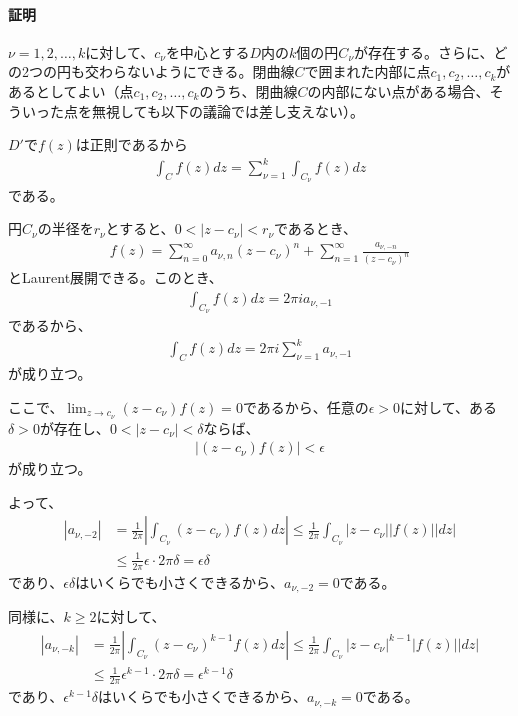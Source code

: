 \paragraph{証明}
$\nu=1,2,\dots,k$に対して、$c_\nu$を中心とする$D$内の$k$個の円$C_\nu$が存在する。さらに、どの2つの円も交わらないようにできる。閉曲線$C$で囲まれた内部に点$c_1,c_2,\dots,c_k$があるとしてよい（点$c_1,c_2,\dots,c_k$のうち、閉曲線$C$の内部にない点がある場合、そういった点を無視しても以下の議論では差し支えない）。

$D'$で$f(z)$は正則であるから
\begin{align*}
    \int_Cf(z)dz
    =\sum_{\nu=1}^{k}\int_{C_\nu}f(z)dz
\end{align*}
である。

円$C_\nu$の半径を$r_\nu$とすると、$0<|z-c_\nu|<r_\nu$であるとき、
\begin{align*}
    f(z)
    =\sum_{n=0}^{\infty}a_{\nu,n}(z-c_\nu)^n
    +\sum_{n=1}^{\infty}\frac{a_{\nu,-n}}{(z-c_\nu)^n}
\end{align*}
とLaurent展開できる。このとき、
\begin{align*}
    \int_{C_\nu}f(z)dz=2\pi i a_{\nu,-1}
\end{align*}
であるから、
\begin{align*}
    \int_Cf(z)dz
    =2\pi i \sum_{\nu=1}^{k}a_{\nu,-1}
\end{align*}
が成り立つ。

ここで、$\lim_{z\longrightarrow c_\nu}(z-c_\nu)f(z)=0$であるから、任意の$\epsilon>0$に対して、ある$\delta>0$が存在し、$0<|z-c_\nu|<\delta$ならば、
\begin{align*}
    |(z-c_\nu)f(z)|<\epsilon
\end{align*}
が成り立つ。

よって、
\begin{align*}
    |a_{\nu,-2}|
    &=\frac{1}{2\pi}\left| \int_{C_\nu}(z-c_\nu)f(z)dz\right|
    \le \frac{1}{2\pi}\int_{C_\nu}|z-c_\nu|\left|f(z)\right||dz|\\
    &\le \frac{1}{2\pi}\epsilon\cdot2\pi \delta=\epsilon \delta
\end{align*}
であり、$\epsilon \delta$はいくらでも小さくできるから、$a_{\nu,-2}=0$である。

同様に、$k\ge2$に対して、
\begin{align*}
    |a_{\nu,-k}|
    &=\frac{1}{2\pi}\left| \int_{C_\nu}(z-c_\nu)^{k-1}f(z)dz\right|
    \le \frac{1}{2\pi}\int_{C_\nu}|z-c_\nu|^{k-1}\left|f(z)\right||dz|\\
    &\le \frac{1}{2\pi}\epsilon^{k-1}\cdot2\pi \delta=\epsilon^{k-1} \delta
\end{align*}
であり、$\epsilon^{k-1} \delta$はいくらでも小さくできるから、$a_{\nu,-k}=0$である。

